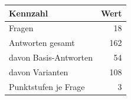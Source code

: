 \begin{tabular}{lr}
\toprule
Kennzahl & Wert \\
\midrule
Fragen & 18 \\
Antworten gesamt & 162 \\
davon Basis-Antworten & 54 \\
davon Varianten & 108 \\
Punktstufen je Frage & 3 \\
\bottomrule
\end{tabular}